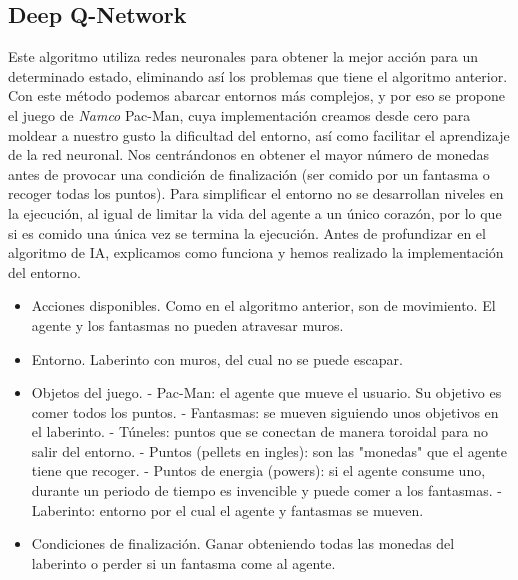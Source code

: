 	\subsection{Deep Q-Network}
	\label{cap:3_3_2}
		Este algoritmo utiliza redes neuronales para obtener la mejor acción para un determinado estado, eliminando así los problemas que tiene el algoritmo anterior. Con este método podemos abarcar entornos más complejos, y por eso se propone el juego de \textit{Namco} Pac-Man, cuya implementación  creamos desde cero para moldear a nuestro gusto la dificultad del entorno, así como facilitar el aprendizaje de la red neuronal. Nos centrándonos en obtener el mayor número de monedas antes de provocar una condición de finalización (ser comido por un fantasma o recoger todas los puntos). Para simplificar el entorno no se desarrollan niveles en la ejecución, al igual de limitar la vida del agente a un único corazón, por lo que si es comido una única vez se termina la ejecución. Antes de profundizar en el algoritmo de IA, explicamos como funciona y hemos realizado la implementación del entorno.
		\vspace{-0.5cm}
		\begin{itemize}		
			\item Acciones disponibles. Como en el algoritmo anterior, son de movimiento. El agente y los fantasmas no pueden atravesar muros.
			\vspace*{-0.2cm}
			\item Entorno. Laberinto con muros, del cual no se puede escapar.
			\item Objetos del juego. 
			\vspace*{-0.3cm}
				\subitem - Pac-Man: el agente que mueve el usuario. Su objetivo es comer todos los puntos.
				\vspace{-1cm}
				\subitem - Fantasmas: se mueven siguiendo unos objetivos en el laberinto.
				\vspace{-0.2cm}
				\subitem - Túneles: puntos que se conectan de manera toroidal para no salir del entorno.
				\vspace{-0.2cm}
				\subitem - Puntos (pellets en ingles): son las "monedas" que el agente tiene que recoger.
				\vspace{-0.2cm}
				\subitem - Puntos de energia (powers): si el agente consume uno, durante un periodo de \hspace*{1.25cm} tiempo es invencible y puede comer a los fantasmas.				
				\vspace{-0.2cm}
				\subitem - Laberinto: entorno por el cual el agente y fantasmas se mueven.
			\vspace*{-0.3cm}
			\item Condiciones de finalización. Ganar obteniendo todas las monedas del laberinto o perder si un fantasma come al agente. 			
		\end{itemize}
		
